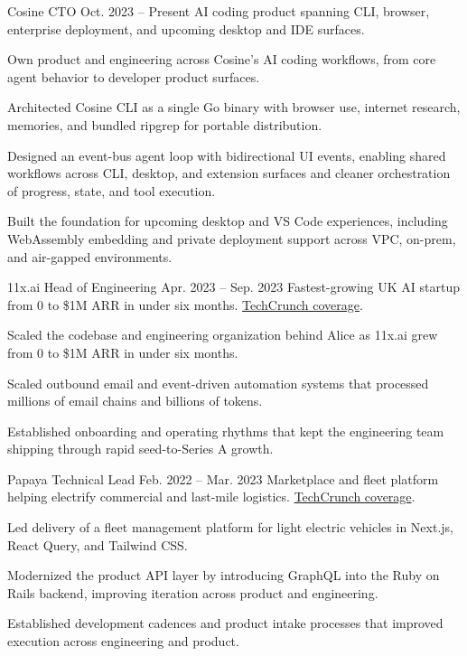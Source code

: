 
\ResumeJob
  {Cosine}
  {CTO}
  {Oct. 2023 -- Present}
  {AI coding product spanning CLI, browser, enterprise deployment, and upcoming desktop and IDE surfaces.}
\begin{ResumeList}
  \item Own product and engineering across Cosine's AI coding workflows, from core agent behavior to developer product surfaces.
  \item Architected Cosine CLI as a single Go binary with browser use, internet research, memories, and bundled ripgrep for portable distribution.
  \item Designed an event-bus agent loop with bidirectional UI events, enabling shared workflows across CLI, desktop, and extension surfaces and cleaner orchestration of progress, state, and tool execution.
  \item Built the foundation for upcoming desktop and VS Code experiences, including WebAssembly embedding and private deployment support across VPC, on-prem, and air-gapped environments.
\end{ResumeList}

\ResumeJob
  {11x.ai}
  {Head of Engineering}
  {Apr. 2023 -- Sep. 2023}
  {Fastest-growing UK AI startup from 0 to \$1M ARR in under six months. \href{https://techcrunch.com/2023/08/11/11xai-closes-2-million-pre-seed-to-create-autonomous-ai-workers/}{TechCrunch coverage}.}
\begin{ResumeList}
  \item Scaled the codebase and engineering organization behind Alice as 11x.ai grew from 0 to \$1M ARR in under six months.
  \item Scaled outbound email and event-driven automation systems that processed millions of email chains and billions of tokens.
  \item Established onboarding and operating rhythms that kept the engineering team shipping through rapid seed-to-Series A growth.
\end{ResumeList}

\ResumeJob
  {Papaya}
  {Technical Lead}
  {Feb. 2022 -- Mar. 2023}
  {Marketplace and fleet platform helping electrify commercial and last-mile logistics. \href{https://techcrunch.com/2022/09/27/papaya-wants-to-help-electrify-last-mile-logistics-in-europe/}{TechCrunch coverage}.}
\begin{ResumeList}
  \item Led delivery of a fleet management platform for light electric vehicles in Next.js, React Query, and Tailwind CSS.
  \item Modernized the product API layer by introducing GraphQL into the Ruby on Rails backend, improving iteration across product and engineering.
  \item Established development cadences and product intake processes that improved execution across engineering and product.
\end{ResumeList}

